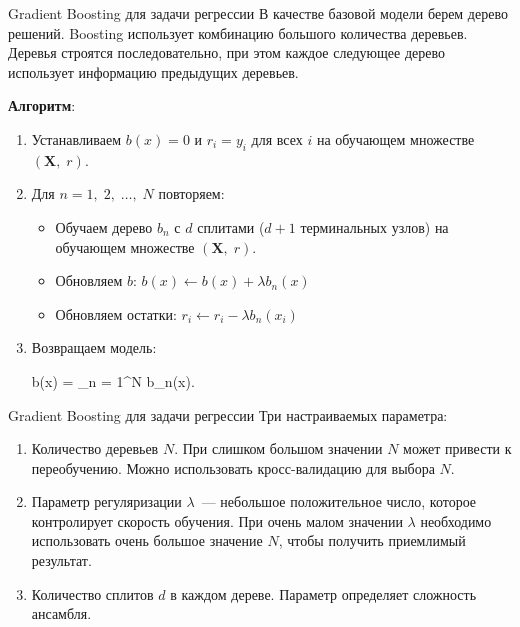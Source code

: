 \documentclass[notheorems, handout]{beamer}
\begin{document}
\begin{frame}{Gradient Boosting для задачи регрессии}
В качестве базовой модели берем дерево решений. Boosting использует комбинацию большого количества деревьев. Деревья строятся последовательно, при этом  каждое следующее дерево использует информацию предыдущих деревьев. 
\par\smallskip
\textbf{Алгоритм}:
\begin{enumerate}
	\item Устанавливаем $b(x) = 0$ и $r_{i} = y_{i}$ для всех $i$ на обучающем множестве $(\mathbf{X},\; r)$.
	\item Для $n = 1,\; 2,\; \dots,\; N$ повторяем:
		\begin{itemize}
			\item Обучаем дерево $b_{n}$ с $d$ сплитами ($d + 1$ терминальных узлов) на обучающем множестве $(\mathbf{X},\; r)$.
			\item Обновляем $b$: $b(x) \gets b(x) + \lambda b_{n}(x)$
			\item Обновляем остатки: $r_{i} \gets r_{i} - \lambda b_{n}(x_{i})$
		\end{itemize}
	\item Возвращаем модель:
		\begin{flalign*}
			b(x) = \displaystyle\sum_{n = 1}^{N} \lambda b_{n}(x).
		\end{flalign*}		
\end{enumerate}
\end{frame}

\begin{frame}{Gradient Boosting для задачи регрессии}
Три настраиваемых параметра:
\begin{enumerate}
	\item Количество деревьев $N$. При слишком большом значении $N$ может привести к переобучению. Можно использовать кросс-валидацию для выбора $N$.
	\item Параметр регуляризации $\lambda$~--- небольшое положительное число, которое контролирует скорость обучения. При очень малом значении $\lambda$ необходимо использовать очень большое значение $N$, чтобы получить приемлимый результат.
	\item Количество сплитов $d$ в каждом дереве. Параметр определяет сложность ансамбля.
\end{enumerate}
\end{frame}
\end{document}
